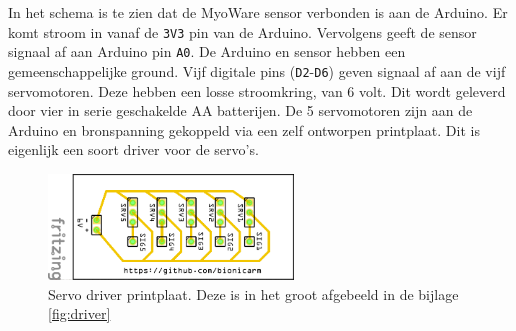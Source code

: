 In het schema is te zien dat de MyoWare sensor verbonden is aan de
Arduino. Er komt stroom in vanaf de \texttt{3V3} pin van de Arduino.
Vervolgens geeft de sensor signaal af aan Arduino pin \texttt{A0}. De
Arduino en sensor hebben een gemeenschappelijke ground. Vijf digitale
pins (\texttt{D2}-\texttt{D6}) geven signaal af aan de vijf
servomotoren. Deze hebben een losse stroomkring, van 6 volt. Dit wordt
geleverd door vier in serie geschakelde AA batterijen. De 5 servomotoren
zijn aan de Arduino en bronspanning gekoppeld via een zelf ontworpen
printplaat. Dit is eigenlijk een soort driver voor de servo's.

\begin{figure}
\centering
\includegraphics[width=0.58\textwidth,height=\textheight]{img/image_24_rot.png}
\caption{Servo driver printplaat. Deze is in het groot afgebeeld in de
bijlage \cref{fig:driver}\label{fig:servodriver}}
\end{figure}
